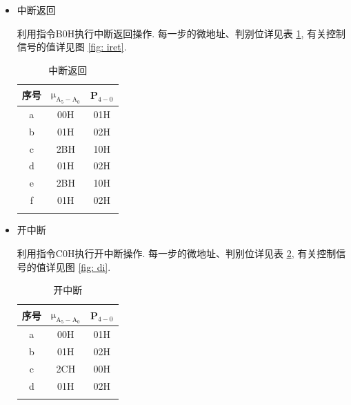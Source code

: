 \documentclass[../main.tex]{subfiles}
\begin{document}
\begin{enumerate}
\begin{itemize}
              \item 中断返回

                    利用指令B0H执行中断返回操作.
                    每一步的微地址、判别位详见表 \ref{tab: iret}, 有关控制信号的值详见图 \ref{fig: iret}.

                    \begin{table}[p]
                        \centering
                        \begin{tabular}{ccc}
                            \Xhline{1pt}
                            序号 & $\mathrm{\mu_{A_{5}-A_{0}}}$ & P$_{4-0}$ \\ \hline
                            a  & 00H                          & 01H       \\
                            b  & 01H                          & 02H       \\
                            c  & 2BH                          & 10H       \\
                            d  & 01H                          & 02H       \\
                            e  & 2BH                          & 10H       \\
                            f  & 01H                          & 02H       \\ \Xhline{1pt}
                        \end{tabular}
                        \caption{中断返回}
                        \label{tab: iret}
                    \end{table}

              \item 开中断

                    利用指令C0H执行开中断操作.
                    每一步的微地址、判别位详见表 \ref{tab: di}, 有关控制信号的值详见图 \ref{fig: di}.

                    \begin{table}[p]
                        \centering
                        \begin{tabular}{ccc}
                            \Xhline{1pt}
                            序号 & $\mathrm{\mu_{A_{5}-A_{0}}}$ & P$_{4-0}$ \\ \hline
                            a  & 00H                          & 01H       \\
                            b  & 01H                          & 02H       \\
                            c  & 2CH                          & 00H       \\
                            d  & 01H                          & 02H       \\ \Xhline{1pt}
                        \end{tabular}
                        \caption{开中断}
                        \label{tab: di}
                    \end{table}


\end{itemize}
\end{enumerate}
\end{document}
